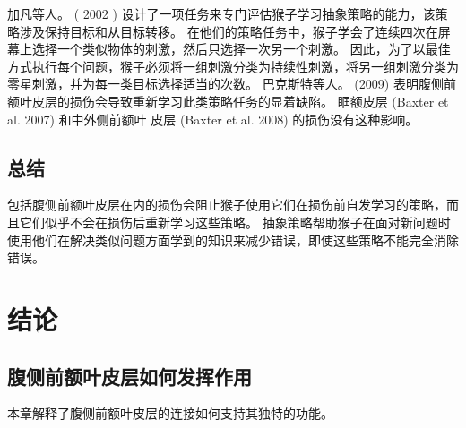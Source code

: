 加凡等人。 ( 2002 ) 设计了一项任务来专门评估猴子学习抽象策略的能力，该策略涉及保持目标和从目标转移。 
在他们的策略任务中，猴子学会了连续四次在屏幕上选择一个类似物体的刺激，然后只选择一次另一个刺激。 
因此，为了以最佳方式执行每个问题，猴子必须将一组刺激分类为持续性刺激，将另一组刺激分类为零星刺激，并为每一类目标选择适当的次数。 
巴克斯特等人。 (2009) 表明腹侧前额叶皮层的损伤会导致重新学习此类策略任务的显着缺陷。 
眶额皮层 (Baxter et al. 2007) 和中外侧前额叶 皮层 (Baxter et al. 2008) 的损伤没有这种影响。



\subsection{总结}
\par 
包括腹侧前额叶皮层在内的损伤会阻止猴子使用它们在损伤前自发学习的策略，而且它们似乎不会在损伤后重新学习这些策略。 
抽象策略帮助猴子在面对新问题时使用他们在解决类似问题方面学到的知识来减少错误，即使这些策略不能完全消除错误。



\section{结论}

\subsection{腹侧前额叶皮层如何发挥作用}
\par

本章解释了腹侧前额叶皮层的连接如何支持其独特的功能。


